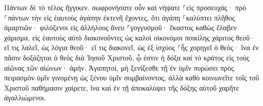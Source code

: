 \documentclass{openreader}
\begin{document}
Πάντων δὲ τὸ τέλος ἤγγικεν. σωφρονήσατε οὖν καὶ νήψατε ⸀εἰς προσευχάς· 
πρὸ ⸀πάντων τὴν εἰς ἑαυτοὺς ἀγάπην ἐκτενῆ ἔχοντες, ὅτι ἀγάπη ⸀καλύπτει πλῆθος ἁμαρτιῶν· 
φιλόξενοι εἰς ἀλλήλους ἄνευ ⸀γογγυσμοῦ· 
ἕκαστος καθὼς ἔλαβεν χάρισμα, εἰς ἑαυτοὺς αὐτὸ διακονοῦντες ὡς καλοὶ οἰκονόμοι ποικίλης χάριτος θεοῦ· 
εἴ τις λαλεῖ, ὡς λόγια θεοῦ· εἴ τις διακονεῖ, ὡς ἐξ ἰσχύος ⸀ἧς χορηγεῖ ὁ θεός· ἵνα ἐν πᾶσιν δοξάζηται ὁ θεὸς διὰ Ἰησοῦ Χριστοῦ, ᾧ ἐστιν ἡ δόξα καὶ τὸ κράτος εἰς τοὺς αἰῶνας τῶν αἰώνων· ἀμήν. 
Ἀγαπητοί, μὴ ξενίζεσθε τῇ ἐν ὑμῖν πυρώσει πρὸς πειρασμὸν ὑμῖν γινομένῃ ὡς ξένου ὑμῖν συμβαίνοντος, 
ἀλλὰ καθὸ κοινωνεῖτε τοῖς τοῦ Χριστοῦ παθήμασιν χαίρετε, ἵνα καὶ ἐν τῇ ἀποκαλύψει τῆς δόξης αὐτοῦ χαρῆτε ἀγαλλιώμενοι. 
\end{document}
